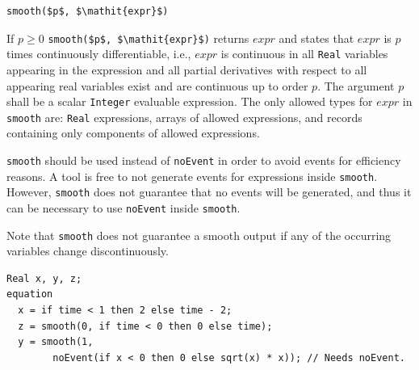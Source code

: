 \begin{operatordefinition}[smooth]
\begin{synopsis}\begin{lstlisting}
smooth($p$, $\mathit{expr}$)
\end{lstlisting}\end{synopsis}
\begin{semantics}
If $p \geq 0$ \lstinline!smooth($p$, $\mathit{expr}$)! returns $\mathit{expr}$ and states that $\mathit{expr}$ is $p$ times continuously differentiable, i.e., $\mathit{expr}$ is continuous in all \lstinline!Real! variables appearing in the expression and all partial derivatives with respect to all appearing real variables exist and are continuous up to order $p$.
The argument $p$ shall be a scalar \lstinline!Integer! evaluable expression.
The only allowed types for $\mathit{expr}$ in \lstinline!smooth! are: \lstinline!Real! expressions, arrays of allowed expressions, and records containing only components of allowed expressions.

\lstinline!smooth! should be used instead of \lstinline!noEvent! in order to avoid events for efficiency reasons.
A tool is free to not generate events for expressions inside \lstinline!smooth!.
However, \lstinline!smooth! does not guarantee that no events will be generated, and thus it can be necessary to use \lstinline!noEvent! inside \lstinline!smooth!.

\begin{nonnormative}
Note that \lstinline!smooth! does not guarantee a smooth output if any of the occurring variables change discontinuously.
\end{nonnormative}

\begin{example}
\begin{lstlisting}[language=modelica]
  Real x, y, z;
equation
  x = if time < 1 then 2 else time - 2;
  z = smooth(0, if time < 0 then 0 else time);
  y = smooth(1,
        noEvent(if x < 0 then 0 else sqrt(x) * x)); // Needs noEvent.
\end{lstlisting}
\end{example}
\end{semantics}
\end{operatordefinition}

